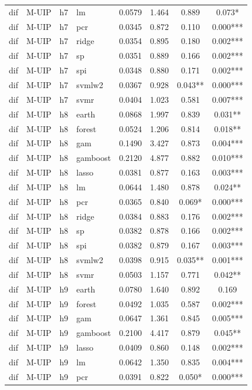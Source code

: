 \begin{ThreePartTable}
\begin{longtable}[t]{llclcccc}
dif & M-UIP & h7 & lm & 0.0579 & 1.464 & 0.889 & 0.073*\\
dif & M-UIP & h7 & pcr & 0.0345 & 0.872 & 0.110 & 0.000***\\
dif & M-UIP & h7 & ridge & 0.0354 & 0.895 & 0.180 & 0.002***\\
dif & M-UIP & h7 & sp & 0.0351 & 0.889 & 0.166 & 0.002***\\
dif & M-UIP & h7 & spi & 0.0348 & 0.880 & 0.171 & 0.002***\\
dif & M-UIP & h7 & svmlw2 & 0.0367 & 0.928 & 0.043** & 0.000***\\
dif & M-UIP & h7 & svmr & 0.0404 & 1.023 & 0.581 & 0.007***\\
\addlinespace
dif & M-UIP & h8 & earth & 0.0868 & 1.997 & 0.839 & 0.031**\\
dif & M-UIP & h8 & forest & 0.0524 & 1.206 & 0.814 & 0.018**\\
dif & M-UIP & h8 & gam & 0.1490 & 3.427 & 0.873 & 0.004***\\
dif & M-UIP & h8 & gamboost & 0.2120 & 4.877 & 0.882 & 0.010***\\
dif & M-UIP & h8 & lasso & 0.0381 & 0.877 & 0.163 & 0.003***\\
dif & M-UIP & h8 & lm & 0.0644 & 1.480 & 0.878 & 0.024**\\
dif & M-UIP & h8 & pcr & 0.0365 & 0.840 & 0.069* & 0.000***\\
dif & M-UIP & h8 & ridge & 0.0384 & 0.883 & 0.176 & 0.002***\\
dif & M-UIP & h8 & sp & 0.0382 & 0.878 & 0.166 & 0.002***\\
dif & M-UIP & h8 & spi & 0.0382 & 0.879 & 0.167 & 0.003***\\
dif & M-UIP & h8 & svmlw2 & 0.0398 & 0.915 & 0.035** & 0.001***\\
dif & M-UIP & h8 & svmr & 0.0503 & 1.157 & 0.771 & 0.042**\\
\addlinespace
dif & M-UIP & h9 & earth & 0.0780 & 1.640 & 0.892 & 0.169\\
dif & M-UIP & h9 & forest & 0.0492 & 1.035 & 0.587 & 0.002***\\
dif & M-UIP & h9 & gam & 0.0647 & 1.361 & 0.845 & 0.005***\\
dif & M-UIP & h9 & gamboost & 0.2100 & 4.417 & 0.879 & 0.045**\\
dif & M-UIP & h9 & lasso & 0.0409 & 0.860 & 0.148 & 0.002***\\
dif & M-UIP & h9 & lm & 0.0642 & 1.350 & 0.835 & 0.004***\\
dif & M-UIP & h9 & pcr & 0.0391 & 0.822 & 0.050* & 0.000***\\

\end{longtable}
\end{ThreePartTable}
